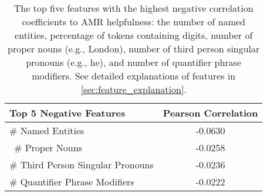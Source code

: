 \begin{table}[t]
    \centering \small
    \setlength\tabcolsep{3pt}
    \begin{tabular}{lc}
    \toprule
    Top 5 Negative Features & Pearson Correlation \\ 
    \midrule
    \# Named Entities & -0.0630 \\
    \    \# Proper Nouns & -0.0258 \\
    \# Third Person Singular Pronouns & -0.0236 \\
    \# Quantifier Phrase Modifiers & -0.0222 \\
    \bottomrule
    \end{tabular}
    \caption{The top five features with the highest negative correlation coefficients to AMR helpfulness: the number of named entities, percentage of tokens containing digits, number of proper nouns (e.g., London), number of third person singular pronouns (e.g., he), and number of quantifier phrase modifiers. See detailed explanations of features in \cref{sec:feature_explanation}.}
    \label{tab:negative_corr_feature}
\end{table}












